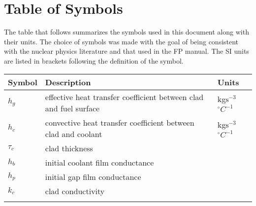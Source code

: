 \documentclass[12pt]{article}
\begin{document}
\section{Table of Symbols}
\label{Sec:ToS}
The table that follows summarizes the symbols used in this document along with their units.  The choice of symbols was made with the goal of being consistent with the nuclear physics literature and that used in the FP manual.  The SI units are listed in brackets following the definition of the symbol.
\begin{longtable*}{l l l}
\toprule
Symbol & Description & Units
\\
\midrule
$h_{g}$ & effective heat transfer coefficient between clad and fuel surface & kg$\text{s}^{-3}$${}^{\circ}C^{-1}$
\\
$h_{c}$ & convective heat transfer coefficient between clad and coolant & kg$\text{s}^{-3}$${}^{\circ}C^{-1}$
\\
$\tau{}_{c}$ & clad thickness & 
\\
$h_{b}$ & initial coolant film conductance & 
\\
$h_{p}$ & initial gap film conductance & 
\\
$k_{c}$ & clad conductivity & 
\\
\bottomrule
\label{Table:ToS}
\end{longtable*}
\end{document}
